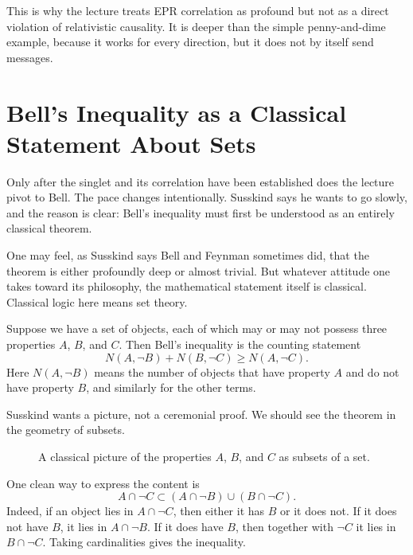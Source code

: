 This is why the lecture treats EPR correlation as profound but not as a direct violation of relativistic causality. It is deeper than the simple penny-and-dime example, because it works for every direction, but it does not by itself send messages.

\section{Bell's Inequality as a Classical Statement About Sets}

Only after the singlet and its correlation have been established does the lecture pivot to Bell. The pace changes intentionally. Susskind says he wants to go slowly, and the reason is clear: Bell's inequality must first be understood as an entirely classical theorem.

One may feel, as Susskind says Bell and Feynman sometimes did, that the theorem is either profoundly deep or almost trivial. But whatever attitude one takes toward its philosophy, the mathematical statement itself is classical. Classical logic here means set theory.

Suppose we have a set of objects, each of which may or may not possess three properties \(A\), \(B\), and \(C\). Then Bell's inequality is the counting statement
\begin{equation}
N(A,\neg B)+N(B,\neg C)\ge N(A,\neg C).
\end{equation}
Here \(N(A,\neg B)\) means the number of objects that have property \(A\) and do not have property \(B\), and similarly for the other terms.

Susskind wants a picture, not a ceremonial proof. We should see the theorem in the geometry of subsets.

\begin{figure}[h]
\centering
{}
\caption{A classical picture of the properties \(A\), \(B\), and \(C\) as subsets of a set.}
\end{figure}

One clean way to express the content is
\[
A\cap \neg C
\subset
(A\cap \neg B)\cup(B\cap \neg C).
\]
Indeed, if an object lies in \(A\cap \neg C\), then either it has \(B\) or it does not. If it does not have \(B\), it lies in \(A\cap \neg B\). If it does have \(B\), then together with \(\neg C\) it lies in \(B\cap \neg C\). Taking cardinalities gives the inequality.


